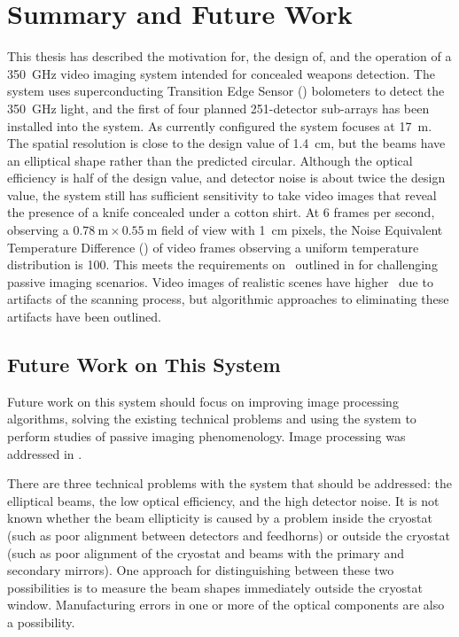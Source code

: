 \chapter{Summary and Future Work} \label{c:summary}

This thesis has described the motivation for, the design of, and the operation of a \SI{350}{\GHz} video imaging system intended for concealed weapons detection.
The system uses superconducting Transition Edge Sensor (\TES) bolometers to detect the \SI{350}{\GHz} light, and the first of four planned 251-detector sub-arrays has been installed into the system.
As currently configured the system focuses at \SI{17}{\m}.
The spatial resolution is close to the design value of \SI{1.4}{\cm}, but the beams have an elliptical shape rather than the predicted circular.
Although the optical efficiency is half of the design value, and detector noise is about twice the design value, the system still has sufficient sensitivity to take video images that reveal the presence of a knife concealed under a cotton shirt.
At 6 frames per second, observing a $\SI{0.78}{\m} \times \SI{0.55}{\m}$ field of view with \SI{1}{\cm} pixels, the Noise Equivalent Temperature Difference (\NETD) of video frames observing a uniform temperature distribution is \SI{100}{\mK}.
This meets the requirements on \NETD\ outlined in  for challenging passive imaging scenarios.
Video images of realistic scenes have higher \NETD\ due to artifacts of the scanning process, but algorithmic approaches to eliminating these artifacts have been outlined.

\section{Future Work on This System}

Future work on this system should focus on improving image processing algorithms, solving the existing technical problems and using the system to perform studies of passive imaging phenomenology.
Image processing was addressed in .

There are three technical problems with the system that should be addressed: the elliptical beams, the low optical efficiency, and the high detector noise.
It is not known whether the beam ellipticity is caused by a problem inside the cryostat (such as poor alignment between detectors and feedhorns) or outside the cryostat (such as poor alignment of the cryostat and beams with the primary and secondary mirrors).
One approach for distinguishing between these two possibilities is to measure the beam shapes immediately outside the cryostat window.
Manufacturing errors in one or more of the optical components are also a possibility.

